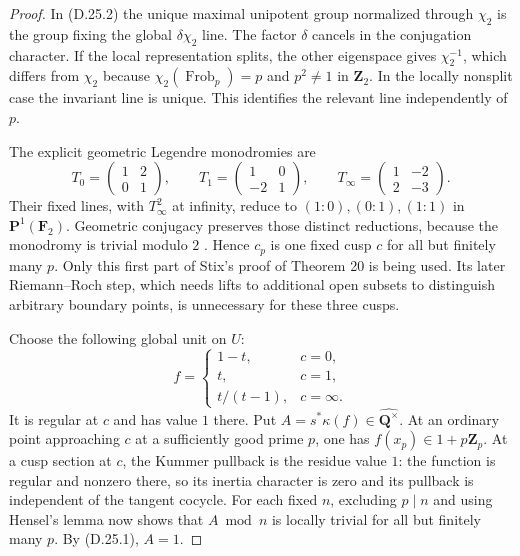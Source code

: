 \begin{proof}
In (D.25.2) the unique maximal unipotent group normalized
through $\chi_2$ is the group fixing the global
$\delta\chi_2$ line.  The factor $\delta$ cancels in the
conjugation character.  If the local representation splits,
the other eigenspace gives $\chi_2^{-1}$, which differs from
$\chi_2$ because $\chi_2(\operatorname{Frob}_p)=p$ and
$p^2\neq1$ in $\mathbf Z_2$.  In the locally nonsplit case
the invariant line is unique.  This identifies the relevant
line independently of $p$.

The explicit geometric Legendre monodromies are
\[
 T_0=\begin{pmatrix}1&2\\0&1\end{pmatrix},\qquad
 T_1=\begin{pmatrix}1&0\\-2&1\end{pmatrix},\qquad
 T_\infty=\begin{pmatrix}1&-2\\2&-3\end{pmatrix}.
\]
Their fixed lines, with $T_\infty^2$ at infinity, reduce to
$(1:0),(0:1),(1:1)$ in $\mathbf P^1(\mathbf F_2)$.
Geometric conjugacy preserves those distinct reductions,
because the monodromy is trivial modulo $2$
\cite[Lemmas 17--19]{D_Stix2015}.  Hence $c_p$ is one fixed
cusp $c$ for all but finitely many $p$.  Only this first part
of Stix's proof of Theorem 20 is being used.  Its later
Riemann--Roch step, which needs lifts to additional open
subsets to distinguish arbitrary boundary points, is
unnecessary for these three cusps.

Choose the following global unit on $U$:
\[
 f=\begin{cases}
  1-t,&c=0,\\
  t,&c=1,\\
  t/(t-1),&c=\infty.
 \end{cases}
\]
It is regular at $c$ and has value $1$ there.  Put
$A=s^*\kappa(f)\in\widehat{\mathbf Q^\times}$.
At an ordinary point approaching $c$ at a sufficiently good
prime $p$, one has $f(x_p)\in1+p\mathbf Z_p$.  At a cusp
section at $c$, the Kummer pullback is the residue value $1$:
the function is regular and nonzero there, so its inertia
character is zero and its pullback is independent of the
tangent cocycle.  For each fixed $n$, excluding $p\mid n$
and using Hensel's lemma now shows that $A\bmod n$ is locally
trivial for all but finitely many $p$.  By (D.25.1), $A=1$.


\end{proof}
